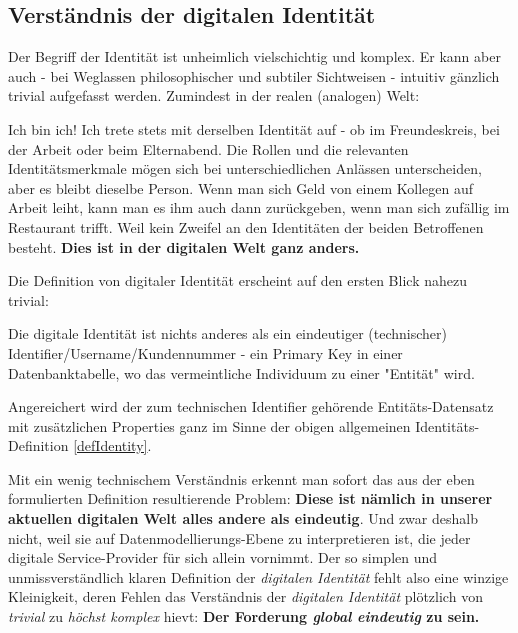 
\subsection{Verständnis der digitalen Identität}
\label{sec:einleitung_digitale_identitaet}

Der Begriff der Identität ist unheimlich vielschichtig und komplex. Er kann aber auch - bei Weglassen philosophischer und subtiler Sichtweisen - intuitiv gänzlich trivial aufgefasst werden. Zumindest in der realen (analogen) Welt:

Ich bin ich! Ich trete stets mit derselben Identität auf - ob im Freundeskreis, bei der Arbeit oder beim Elternabend. Die Rollen und die relevanten Identitätsmerkmale mögen sich bei unterschiedlichen Anlässen unterscheiden, aber es bleibt dieselbe Person. Wenn man sich Geld von einem Kollegen auf Arbeit leiht, kann man es ihm auch dann zurückgeben, wenn man sich zufällig im Restaurant trifft. Weil kein Zweifel an den Identitäten der beiden Betroffenen besteht. \textbf{Dies ist in der digitalen Welt ganz anders.}

\vspace{0.2cm}

Die Definition von digitaler Identität erscheint auf den ersten Blick nahezu trivial:

\vspace{0.3cm}

\begin{Business-Def}\label{defDigIdentity}

Die digitale Identität ist nichts anderes als ein eindeutiger (technischer) Identifier/Username/Kundennummer - ein Primary Key in einer Datenbanktabelle, wo das vermeintliche Individuum zu einer "Entität" wird.

\vspace{0.2cm}

Angereichert wird der zum technischen Identifier gehörende Entitäts-Datensatz mit zusätzlichen Properties ganz im Sinne der obigen allgemeinen Identitäts-Definition \ref{defIdentity}. 

\end{Business-Def}

\vspace{0.3cm}

Mit ein wenig technischem Verständnis erkennt man sofort das aus der eben formulierten Definition resultierende Problem: \textbf{Diese ist nämlich in unserer aktuellen digitalen Welt alles andere als eindeutig}. Und zwar deshalb nicht, weil sie auf Datenmodellierungs-Ebene zu interpretieren ist, die jeder digitale Service-Provider für sich allein vornimmt. Der so simplen und unmissverständlich klaren Definition der \textit{digitalen Identität} fehlt also eine winzige Kleinigkeit, deren Fehlen das Verständnis der \textit{digitalen Identität} plötzlich von \textit{trivial} zu \textit{höchst komplex} hievt: \textbf{Der Forderung \textit{global eindeutig} zu sein.}

